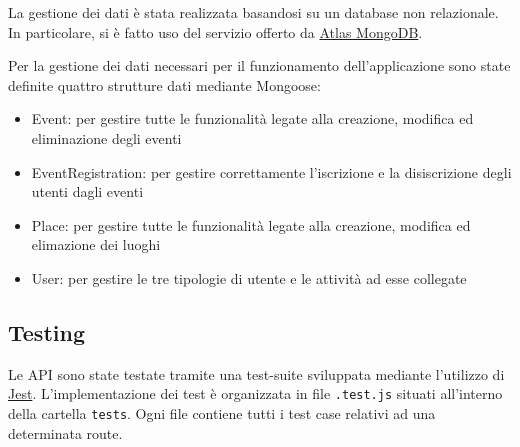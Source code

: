 \documentclass[9pt]{extarticle}
\begin{document}
La gestione dei dati è stata realizzata basandosi su un database non
relazionale. In particolare, si è fatto uso del servizio offerto da
\href{https://www.mongodb.com/products/platform/atlas-database}{Atlas MongoDB}.

Per la gestione dei dati necessari per il funzionamento dell'applicazione sono state definite quattro strutture dati mediante Mongoose:
\begin{itemize}
	\item Event: per gestire tutte le funzionalità legate alla creazione, modifica ed eliminazione degli eventi
	\item EventRegistration: per gestire correttamente l'iscrizione e la disiscrizione degli utenti dagli eventi
	\item Place: per gestire tutte le funzionalità legate alla creazione, modifica ed elimazione dei luoghi
	\item User: per gestire le tre tipologie di utente e le attività ad esse collegate
\end{itemize}

\newpage
\subsection{Testing}

Le API sono state testate tramite una test-suite sviluppata mediante l'utilizzo di \href{https://jestjs.io/}{Jest}. L’implementazione dei test è organizzata in file \verb|.test.js| situati all'interno della cartella \verb*|tests|. Ogni file contiene tutti i test case relativi ad una determinata route.
\end{document}
